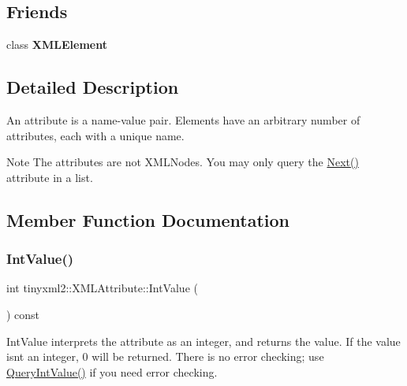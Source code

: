 \subsection*{Friends}
\begin{DoxyCompactItemize}
\item 
\mbox{\label{classtinyxml2_1_1XMLAttribute_ac2fba9b6e452829dd892f7392c24e0eb}} 
class {\bfseries X\+M\+L\+Element}
\end{DoxyCompactItemize}


\subsection{Detailed Description}
An attribute is a name-\/value pair. Elements have an arbitrary number of attributes, each with a unique name.

\begin{DoxyNote}{Note}
The attributes are not X\+M\+L\+Nodes. You may only query the \mbox{\hyperlink{classtinyxml2_1_1XMLAttribute_aee53571b21e7ce5421eb929523a8bbe6}{Next()}} attribute in a list. 
\end{DoxyNote}


\subsection{Member Function Documentation}
\mbox{\label{classtinyxml2_1_1XMLAttribute_adfa2433f0fdafd5c3880936de9affa80}} 
\subsubsection{\texorpdfstring{IntValue()}{IntValue()}}
{\footnotesize\ttfamily int tinyxml2\+::\+X\+M\+L\+Attribute\+::\+Int\+Value (\begin{DoxyParamCaption}{ }\end{DoxyParamCaption}) const\hspace{0.3cm}{\ttfamily [inline]}}

Int\+Value interprets the attribute as an integer, and returns the value. If the value isn\textquotesingle{}t an integer, 0 will be returned. There is no error checking; use \mbox{\hyperlink{classtinyxml2_1_1XMLAttribute_a6d5176260db00ea301c01af8457cd993}{Query\+Int\+Value()}} if you need error checking. \mbox{\label{classtinyxml2_1_1XMLAttribute_a6d5176260db00ea301c01af8457cd993}} 
